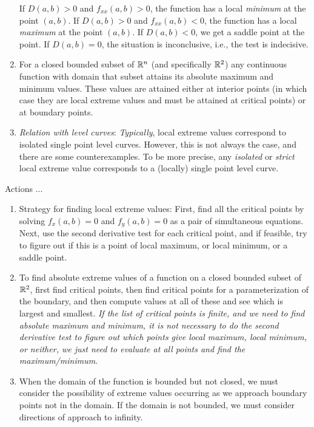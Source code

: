 \documentclass[10pt]{amsart}
\begin{document}
\begin{enumerate}
  If $D(a,b) > 0$ and $f_{xx}(a,b) > 0$, the function has a local {\em
  minimum} at the point $(a,b)$. If $D(a,b) > 0$ and $f_{xx}(a,b) <
  0$, the function has a local {\em maximum} at the point $(a,b)$. If
  $D(a,b) < 0$, we get a saddle point at the point. If $D(a,b) = 0$,
  the situation is inconclusive, i.e., the test is indecisive.
\item For a closed bounded subset of $\mathbb{R}^n$ (and specifically $\mathbb{R}^2$)
  any continuous function with domain that subset attains its absolute
  maximum and minimum values. These values are attained either at
  interior points (in which case they are local extreme values and
  must be attained at critical points) or at boundary points.
\item {\em Relation with level curves}: {\em Typically}, local extreme
  values correspond to isolated single point level curves. However,
  this is not always the case, and there are some counterexamples. To
  be more precise, any {\em isolated} or {\em strict} local extreme
  value corresponds to a (locally) single point level curve.
\end{enumerate}

Actions ...

\begin{enumerate}
\item Strategy for finding local extreme values: First, find all the
  critical points by solving $f_x(a,b) = 0$ and $f_y(a,b) = 0$ as a
  pair of simultaneous equations. Next, use the second derivative test
  for each critical point, and if feasible, try to figure out if this
  is a point of local maximum, or local minimum, or a saddle point.
\item To find absolute extreme values of a function on a closed
  bounded subset of $\mathbb{R}^2$, first find critical points, then find
  critical points for a parameterization of the boundary, and then
  compute values at all of these and see which is largest and
  smallest. {\em If the list of critical points is finite, and we need
  to find absolute maximum and minimum, it is not necessary to do the
  second derivative test to figure out which points give local
  maximum, local minimum, or neither, we just need to evaluate at all
  points and find the maximum/minimum}.
\item When the domain of the function is bounded but not closed, we
  must consider the possibility of extreme values occurring as we
  approach boundary points not in the domain. If the domain is not
  bounded, we must consider directions of approach to infinity.
\end{enumerate}
\end{document}
